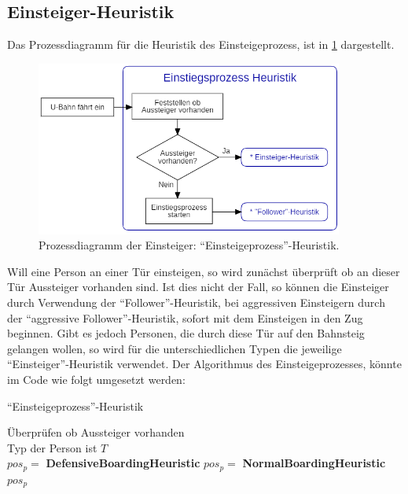 \subsection{Einsteiger-Heuristik} \label{EM}
Das Prozessdiagramm für die Heuristik des Einsteigeprozess, ist in \figurename \ref{fig:EH} dargestellt. 
\begin{figure}[H]
	\centering
		\includegraphics[width=0.9\textwidth]{pictures/model/algorithm/boarding/boarding_process.png}
	\caption{Prozessdiagramm der Einsteiger: "`Einsteigeprozess"'-Heuristik.}
	\label{fig:EH}
\end{figure}
Will eine Person an einer Tür einsteigen, so wird zunächst überprüft ob an dieser Tür Aussteiger vorhanden sind. Ist dies nicht der Fall, so können die Einsteiger durch Verwendung der "`Follower"'-Heuristik, bei aggressiven Einsteigern durch der "`aggressive Follower"'-Heuristik, sofort mit dem Einsteigen in den Zug beginnen. Gibt es jedoch Personen, die durch diese Tür auf den Bahnsteig gelangen wollen, so wird für die unterschiedlichen Typen die jeweilige "`Einsteiger"'-Heuristik verwendet. Der Algorithmus des Einsteigeprozesses, könnte im Code wie folgt umgesetzt werden:

\begin{algorithm} [H]
	\caption{"`Einsteigeprozess"'-Heuristik}
	
	\BoardingHeuristic{} {
		Überprüfen ob Aussteiger vorhanden \\
		Typ der Person ist $T$\\
		 {
			 { 
				$pos_p = $ \textbf{DefensiveBoardingHeuristic}
			} {
				$pos_p = $ \textbf{NormalBoardingHeuristic} 	
			} 
		} 
		\Return $pos_p$
	}
\end{algorithm}

